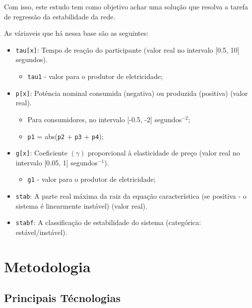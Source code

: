 \documentclass[journal]{IEEEtran}
\begin{document}
Com isso, este estudo tem como objetivo achar uma solução que resolva a tarefa de regressão da estabilidade da rede.

As váriaveis que há nessa base são as seguintes:

\begin{itemize}
    \item \texttt{tau[x]}: Tempo de reação do participante (valor real no intervalo [0.5, 10] segundos).
          \begin{itemize}
              \item \texttt{tau1} - valor para o produtor de eletricidade;
          \end{itemize}
    \item \texttt{p[x]}: Potência nominal consumida (negativa) ou produzida (positiva) (valor real).
          \begin{itemize}
              \item Para consumidores, no intervalo [-0.5, -2] segundos$^{-2}$;
              \item \texttt{p1} = abs(\texttt{p2} + \texttt{p3} + \texttt{p4});
          \end{itemize}
    \item \texttt{g[x]}: Coeficiente $(\gamma)$ proporcional à elasticidade de preço (valor real no intervalo [0.05, 1] segundos$^{-1}$).
          \begin{itemize}
              \item \texttt{g1} - valor para o produtor de eletricidade;
          \end{itemize}
    \item \texttt{stab}: A parte real máxima da raiz da equação característica (se positiva - o sistema é linearmente instável) (valor real).
    \item \texttt{stabf}: A classificação de estabilidade do sistema (categórica: estável/instável).
\end{itemize}


\section{Metodologia}
\subsection{Principais Técnologias}
\end{document}
